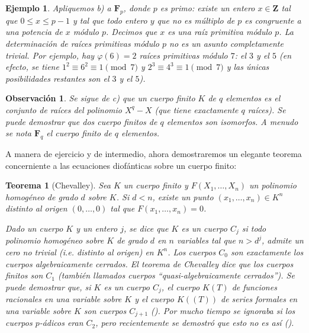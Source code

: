 \documentclass[10pt,oneside,bibtotoc,smallheadings,leqno,a5paper,DIV=12]{scrbook}
\newcommand{\ZZ}{\mathbf{Z}}
\newcommand{\FF}{\mathbf{F}}
\numberwithin{equation}{section}
\newenvironment{comm}%
	{\begin{trivlist}\item\small\itshape}
	{\end{trivlist}}
\theoremstyle{defi}
\theoremstyle{enonce}
\newtheorem{theorem}{Teorema}
\theoremstyle{rem}
\newtheorem*{example*}{Ejemplo}
\newtheorem*{remark*}{Observaci\'on}
\numberwithin{theorem}{section}
\numberwithin{proposition}{section}
\numberwithin{definition}{section}
\numberwithin{lemma}{section}
\numberwithin{corollary}{section}
\numberwithin{example}{section}
\numberwithin{footnote}{section}%
\begin{document}
\begin{example*}
Apliquemos b) a $\FF_{p}$, donde $p$ es primo: existe un entero $x\in\ZZ$ tal que $0\leq x\leq p-1$ y tal
que todo entero $y$ que no es m\'ultiplo de $p$ es congruente a una potencia de $x$ m\'odulo $p$. Decimos
que $x$ es {\em una ra\'iz primitiva m\'odulo $p$.} La determinaci\'on de ra\'ices primitivas m\'odulo
$p$ no es un asunto completamente trivial. Por ejemplo, hay $\varphi(6) = 2$ ra\'ices primitivas m\'odulo $7$:
el $3$ y el $5$ (en efecto, se tiene $1^{2}\equiv 6^{2}\equiv 1\pmod 7$ y $2^{3}\equiv 4^{3}\equiv 1\pmod 7$
y las \'unicas posibilidades restantes son el $3$ y el $5$).
\end{example*}

\begin{remark*}
Se sigue de c) que un cuerpo finito $K$ de $q$ elementos es el conjunto de ra\'ices del polinomio $X^{q}-X$
(que tiene exactamente $q$ ra\'ices). Se puede demostrar que dos cuerpo finitos de $q$ elementos son isomorfos.
A menudo se nota $\FF_{q}$ el cuerpo finito de $q$ elementos.
\end{remark*}

A manera de ejercicio y de intermedio, ahora demostraremos un elegante teorema concerniente a las
ecuaciones diof\'anticas sobre un cuerpo finito:

\begin{theorem}[Chevalley]\label{teo1.7.2}
Sea $K$ un cuerpo finito y $F(X_{1},\dots,X_{n})$ un polinomio homog\'eneo de grado $d$ sobre $K$.
Si $d < n$, existe un punto $(x_{1},\dots,x_{n})\in K^{n}$ distinto al origen $(0,\dots,0)$ tal que
$F(x_{1},\dots,x_{n}) = 0$.
\end{theorem}

\begin{comm}
Dado un cuerpo $K$ y un entero $j$, se dice que $K$ es un {\em cuerpo} $C_{j}$ si todo polinomio
homog\'eneo sobre $K$ de grado $d$ en $n$ variables {\em tal que} $n > d^{j}$, admite un cero no
trivial (i.e. distinto al origen) en $K^{n}$. Los cuerpos $C_{0}$ son exactamente los cuerpos algebraicamente
cerrados. El teorema de Chevalley dice que los cuerpos finitos son $C_{1}$ (tambi\'en llamados
cuerpos ``quasi-algebraicamente cerrados''). Se puede demostrar que, si $K$ es un cuerpo $C_{j}$, el
cuerpo $K(T)$ de funciones racionales en una variable sobre $K$ y el cuerpo $K((T))$ de series formales
en una variable sobre $K$ son cuerpos $C_{j+1}$ (\cite{Lang}). Por mucho tiempo se ignoraba si los
cuerpos $p$-\'adicos eran $C_{2}$, pero recientemente se demostr\'o que esto no es as\'i (\cite{Terjanian}).
\end{comm}
\end{document}
